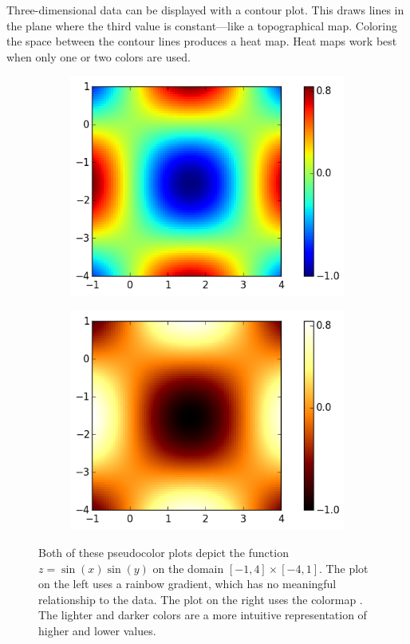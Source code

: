 Three-dimensional data can be displayed with a contour plot.
This draws lines in the plane where the third value is constant---like a topographical map.
Coloring the space between the contour lines produces a heat map.
Heat maps work best when only one or two colors are used.

\begin{figure}[h]
\centering
\begin{subfigure}{.5\textwidth}
  \centering
  \includegraphics[width=\textwidth]{heatmap_color.png}
\end{subfigure}%
\begin{subfigure}{.5\textwidth}
  \centering
  \includegraphics[width=\textwidth]{heatmap_hot.png}
\end{subfigure}
\caption{Both of these pseudocolor plots depict the function
    $z = \sin(x)\sin(y)$ on the domain $[-1,4] \times [-4,1]$.
The plot on the left uses a rainbow gradient, which has no meaningful relationship to the data.
The plot on the right uses the colormap .  The lighter and darker colors are a more intuitive
representation of higher and lower values.}

\label{fig:heatmap}
\end{figure}

